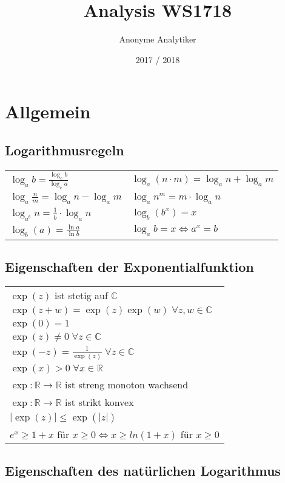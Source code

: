 \documentclass[a4paper,9pt]{extarticle}
\title{Analysis WS1718}
\author{Anonyme Analytiker}
\date{2017 / 2018}
\begin{document}
\section*{Allgemein}


	\subsection*{Logarithmusregeln}

	\begin{tabular}{ll}
		$\log_a b = \frac{\log_c b}{\log_c a}$ & $\log_a(n\cdot m) = \log_an+\log_am$ \\[1ex]
		$\log_a\frac{n}{m} = \log_an-\log_am$ & $\log_an^m = m \cdot \log_an$ \\[1ex]
		$\log_{a^b}n = \frac{1}{b} \cdot \log_an$ & $\log_b (b^x) = x$ \\
		$\log_b (a) = \frac{\ln a}{\ln b}$ & $\log_a b =x \iff a^x = b$
	\end{tabular}

	\subsection*{Eigenschaften der Exponentialfunktion}
	
	\begin{tabular}{l}
		$\exp(z)$ ist stetig auf $\mathbb{C}$ \\
		$\exp(z + w) = \exp(z) \exp(w) \; \forall z, w \in \mathbb{C}$ \\
		$\exp(0) = 1$ \\
		$\exp(z) \neq 0 \; \forall z \in \mathbb{C}$ \\
		$\exp(-z) = \frac{1}{\exp(z)}  \; \forall z \in \mathbb{C}$ \\
		$\exp(x) > 0 \; \forall x \in \mathbb{R}$ \\
		$\exp: \mathbb{R} \to \mathbb{R}$ ist streng monoton wachsend \\
		$\exp: \mathbb{R} \to \mathbb{R}$ ist strikt  konvex \\
		$|\exp(z)| \leq \exp(|z|)$ \\
		$e^x \geq 1 + x$ für $x \geq 0 \iff x \geq ln(1 + x)$ für $x \geq 0$
	\end{tabular}

	\subsection*{Eigenschaften des natürlichen Logarithmus}
	
\end{document}
